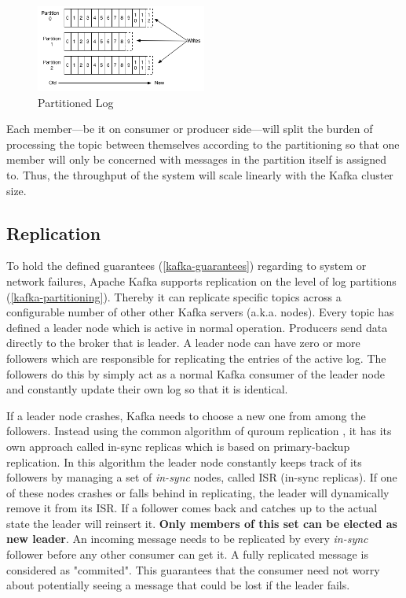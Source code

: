\begin{figure}[H]
    \centering
    \includegraphics[width=0.5\textwidth]{images/log_anatomy.png}
    \caption{Partitioned Log \cite{apachekafka}}
    \label{fig:the-log}
\end{figure}

Each member---be it on consumer or producer side---will split the burden of
processing the topic between themselves according to the partitioning so that
one member will only be concerned with messages in the partition itself is
assigned to. Thus, the throughput of the system will scale linearly with the
Kafka cluster size. \cite{apachekafka}


\subsection{Replication}
To hold the defined guarantees (\ref{kafka-guarantees}) regarding to system
or network failures, Apache Kafka supports \gls{replication} on the level of log
partitions (\ref{kafka-partitioning}). Thereby it can replicate specific topics
across a configurable number of other other Kafka servers (a.k.a. nodes). Every
topic has defined a leader node which is active in normal operation. Producers
send data directly to the broker that is leader. A leader node can have zero or
more followers which are responsible for replicating the entries of the active
log. The followers do this by simply act as a normal Kafka consumer of the
leader node and constantly update their own log so that it is identical.
\cite{apachekafka}


If a leader node crashes, Kafka needs to choose a new one from among the
followers. Instead using the common algorithm of quroum replication , it
has its own approach called in-sync replicas which is based on primary-backup
replication. In this algorithm the leader node
constantly keeps track of its followers by managing a set of \textit{in-sync}
nodes, called ISR (in-sync replicas). If one of these nodes crashes or falls
behind in replicating, the leader will dynamically remove it from its ISR. If a
follower comes back and catches up to the actual state the leader will reinsert
it. \textbf{Only members of this set can be elected as new leader}. An incoming
message needs to be replicated by every \textit{in-sync} follower before any
other consumer can get it. A fully replicated message is considered as
"commited". This guarantees that the consumer need not worry about potentially
seeing a message that could be lost if the leader fails. \cite{apachekafka}
\cite{kafka-wiki-replication}

